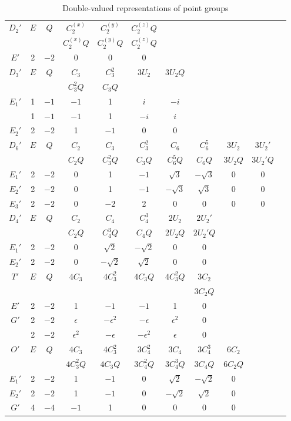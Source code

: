 \clearpage
\setcounter{table}{7}
\begin{table}[p]
\centering
\caption{Double-valued representations of point groups}
\scriptsize
\setlength{\tabcolsep}{3.2pt}
\renewcommand{\arraystretch}{1.18}
\begin{tabular}{c|*{10}{c}}
\hline
$D_2'$&$E$&$Q$&$C_2^{(x)}$&$C_2^{(y)}$&$C_2^{(z)}Q$\\
&&&$C_2^{(x)}Q$&$C_2^{(y)}Q$&$C_2^{(z)}Q$\\ \hline
$E'$&2&$-2$&0&0&0\\ \hline
$D_3'$&$E$&$Q$&$C_3$&$C_3^2$&$3U_2$&$3U_2Q$\\
&&&$C_3^2Q$&$C_3Q$&&\\ \hline
$E_1'$&1&$-1$&$-1$&1&$i$&$-i$\\
&1&$-1$&$-1$&1&$-i$&$i$\\
$E_2'$&2&$-2$&1&$-1$&0&0\\ \hline
$D_6'$&$E$&$Q$&$C_2$&$C_3$&$C_3^2$&$C_6$&$C_6^5$&$3U_2$&$3U_2'$\\
&&&$C_2Q$&$C_3^2Q$&$C_3Q$&$C_6^5Q$&$C_6Q$&$3U_2Q$&$3U_2'Q$\\ \hline
$E_1'$&2&$-2$&0&1&$-1$&$\sqrt3$&$-\sqrt3$&0&0\\
$E_2'$&2&$-2$&0&1&$-1$&$-\sqrt3$&$\sqrt3$&0&0\\
$E_3'$&2&$-2$&0&$-2$&2&0&0&0&0\\ \hline
$D_4'$&$E$&$Q$&$C_2$&$C_4$&$C_4^3$&$2U_2$&$2U_2'$\\
&&&$C_2Q$&$C_4^3Q$&$C_4Q$&$2U_2Q$&$2U_2'Q$\\ \hline
$E_1'$&2&$-2$&0&$\sqrt2$&$-\sqrt2$&0&0\\
$E_2'$&2&$-2$&0&$-\sqrt2$&$\sqrt2$&0&0\\ \hline
$T'$&$E$&$Q$&$4C_3$&$4C_3^2$&$4C_3Q$&$4C_3^2Q$&$3C_2$\\
&&&&&&&$3C_2Q$\\ \hline
$E'$&2&$-2$&1&$-1$&$-1$&1&0\\
$G'$&2&$-2$&$\epsilon$&$-\epsilon^2$&$-\epsilon$&$\epsilon^2$&0\\
&2&$-2$&$\epsilon^2$&$-\epsilon$&$-\epsilon^2$&$\epsilon$&0\\ \hline
$O'$&$E$&$Q$&$4C_3$&$4C_3^2$&$3C_4^2$&$3C_4$&$3C_4^3$&$6C_2$\\
&&&$4C_3^2Q$&$4C_3Q$&$3C_4^2Q$&$3C_4^3Q$&$3C_4Q$&$6C_2Q$\\ \hline
$E_1'$&2&$-2$&1&$-1$&0&$\sqrt2$&$-\sqrt2$&0\\
$E_2'$&2&$-2$&1&$-1$&0&$-\sqrt2$&$\sqrt2$&0\\
$G'$&4&$-4$&$-1$&1&0&0&0&0\\ \hline
\end{tabular}
\end{table}
\clearpage

